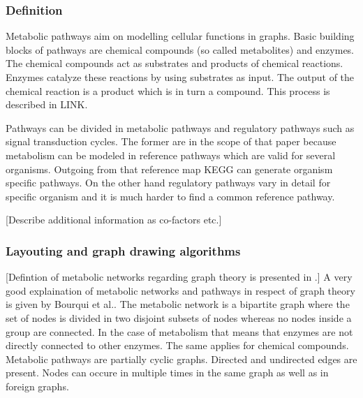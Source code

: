\subsubsection{Definition}

Metabolic pathways aim on modelling cellular functions in graphs. Basic building blocks of pathways are chemical compounds (so called metabolites) and enzymes. The chemical compounds act as substrates and products of chemical reactions. Enzymes catalyze these reactions by using substrates as input. The output of the chemical reaction is a product which is in turn a compound. This process is described in LINK. 

Pathways can be divided in metabolic pathways and regulatory pathways such as signal transduction cycles. The former are in the scope of that paper because metabolism can be modeled in reference pathways which are valid for several organisms\cite{Kanehisa2000}. Outgoing from that reference map KEGG can generate organism specific pathways. On the other hand regulatory pathways vary in detail for specific organism and it is much harder to find a common reference pathway\cite{Kanehisa2000}.

[Describe additional information as co-factors etc.]

\subsubsection{Layouting and graph drawing algorithms}

[Defintion of metabolic networks regarding graph theory is presented in \cite{Bourqui2006}.]
A very good explaination of metabolic networks and pathways in respect of graph theory is given by Bourqui et al.\cite{Bourqui2006}.
The metabolic network is a bipartite graph where the set of nodes is divided in two disjoint subsets of nodes whereas no nodes inside a group are connected. In the case of metabolism that means that enzymes are not directly connected to other enzymes. The same applies for chemical compounds. 
Metabolic pathways are partially cyclic graphs. Directed and undirected edges are present.
Nodes can occure in multiple times in the same graph as well as in foreign graphs.

